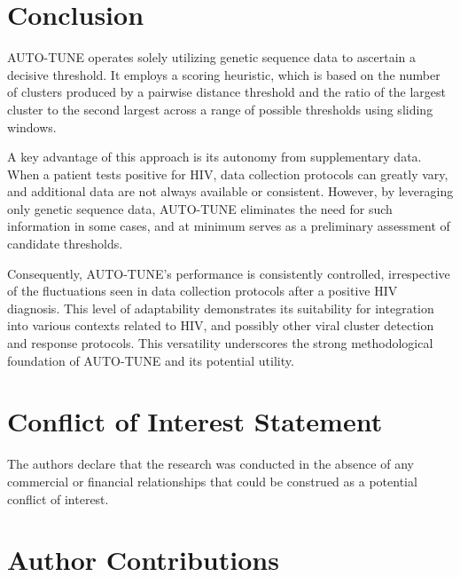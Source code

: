 \documentclass[utf8]{FrontiersinHarvard} %
\newcommand{\TODO}[1]{{\color{red}{#1}}}
\begin{document}
\section{Conclusion}

AUTO-TUNE operates solely utilizing genetic sequence data to ascertain a
decisive threshold. It employs a scoring heuristic, which is based on the
number of clusters produced by a pairwise distance threshold and the ratio of
the largest cluster to the second largest across a range of possible thresholds
using sliding windows.

A key advantage of this approach is its autonomy from supplementary data. When
a patient tests positive for HIV, data collection protocols can greatly vary,
and additional data are not always available or consistent. However, by
leveraging only genetic sequence data, AUTO-TUNE eliminates the need for such
information in some cases, and at minimum serves as a preliminary assessment of
candidate thresholds.

Consequently, AUTO-TUNE's performance is consistently controlled, irrespective
of the fluctuations seen in data collection protocols after a positive HIV
diagnosis. This level of adaptability demonstrates its suitability for
integration into various contexts related to HIV, and possibly other viral
cluster detection and response protocols. This versatility underscores the
strong methodological foundation of AUTO-TUNE and its potential utility.

\TODO{SAR -- Can we provide proof that Auto-Tune is useful for other viruses as
	well as HIV? There should be at least some databases of HCV, influenza and
	SARS-CoV-2 available to test this.}

\section*{Conflict of Interest Statement}

The authors declare that the research was conducted in the absence of any
commercial or financial relationships that could be construed as a potential
conflict of interest.

\section*{Author Contributions}
\end{document}
